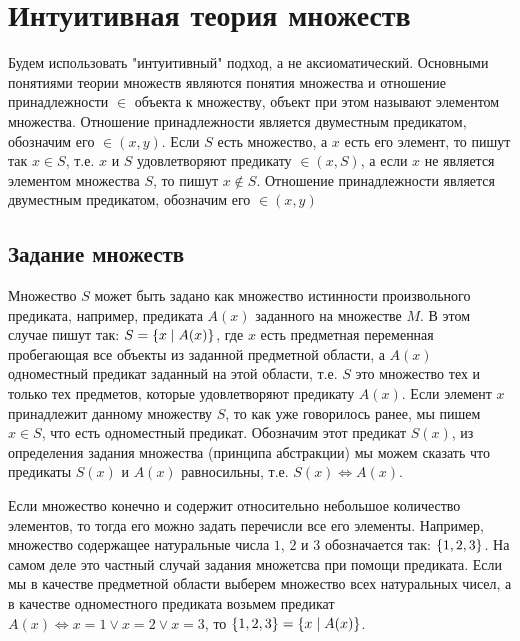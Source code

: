 \documentclass[letterpaper, 10pt]{article}
\theoremstyle{definition}
\begin{document}
\section{Интуитивная теория множеств}

Будем использовать "интуитивный" подход, а не аксиоматический. Основными
понятиями теории множеств являются понятия множества и отношение принадлежности
$\in$ объекта к множеству, объект при этом называют элементом множества.
Отношение принадлежности является двуместным предикатом, обозначим его $\in
(x,y)$. Если $S$ есть множество, а $x$ есть его элемент, то пишут так $x \in S$,
т.е. $x$ и $S$ удовлетворяют предикату $\in (x,S)$, а если $x$ не является
элементом множества $S$, то пишут $x \not\in S$. Отношение принадлежности
является двуместным предикатом, обозначим его $\in (x,y)$ 

\subsection{Задание множеств}

Множество $S$ может быть задано как множество истинности произвольного
предиката, например, предиката $A(x)$ заданного на множестве $M$. В этом случае
пишут так: $S = \left\{x \mid A(x)\right\}$, где $x$ есть предметная переменная
пробегающая все объекты из заданной предметной области, а $A(x)$ одноместный
предикат заданный на этой области, т.е. $S$ это множество тех и только тех
предметов, которые удовлетворяют предикату $A(x)$. Если элемент $x$ принадлежит
данному множеству $S$, то как уже говорилось ранее, мы пишем $x \in S$, что есть
одноместный предикат. Обозначим этот предикат $S(x)$, из определения задания
множества (принципа абстракции) мы можем сказать что предикаты $S(x)$ и $A(x)$
равносильны, т.е. $S(x) \Leftrightarrow A(x)$.

Если множество конечно и содержит относительно небольшое количество элементов,
то тогда его можно задать перечисли все его элементы. Например, множество
содержащее натуральные числа $1$, $2$ и $3$ обозначается так: $\left\{1,2,3\right\}$. На
самом деле это частный случай задания множетсва при помощи предиката. Если мы в
качестве предметной области выберем множество всех натуральных чисел, а в
качестве одноместного предиката возьмем предикат $A(x) \Leftrightarrow x = 1
\lor x = 2 \lor x = 3$, то $\left\{1,2,3\right\} = \left\{x \mid A(x)\right\}$.
\end{document}
